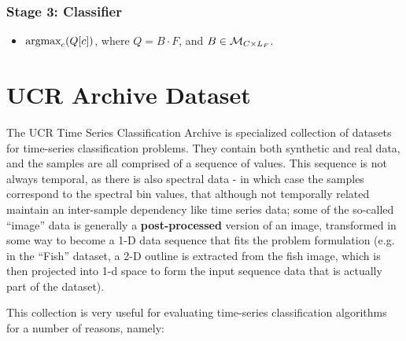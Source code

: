 \subsubsection{Stage 3: Classifier}\label{sec:ha_s3}
\begin{itemize}
    \item $\text{argmax}\sb{c} (Q[c])$, where $Q = B \cdot F$, and  $B \in \mathcal{M}\sb{C \times L_F}$.
\end{itemize}

\section{UCR Archive Dataset}
The UCR Time Series Classification Archive \cite{UCRArchive2018} is specialized collection of datasets for time-series classification problems. 
They contain both synthetic and real data, and the samples are all comprised of a sequence of values. This sequence is not always temporal, as there is also
spectral data - in which case the samples correspond to the spectral bin values, that although not temporally related maintain an inter-sample dependency like time series data;
some of the so-called ``image'' data is generally a \textbf{post-processed} version of an image, transformed in some way to become a 1-D data sequence that fits the problem formulation 
(e.g. in the ``Fish'' dataset, a 2-D outline is extracted from the fish image, which is then projected into 1-d space to form the input sequence data that is actually part of the dataset).

This collection is very useful for evaluating time-series classification algorithms for a number of reasons, namely:

